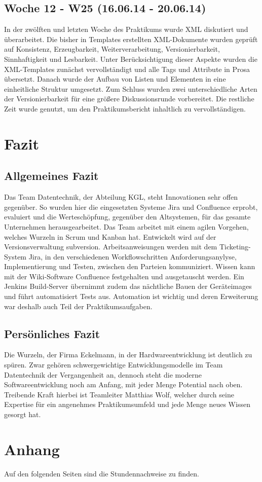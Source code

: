 \documentclass{article}
\begin{document}
\subsection{Woche 12 - W25 (16.06.14 - 20.06.14)}

In der zwölften und letzten Woche des Praktikums wurde XML diskutiert und überarbeitet. Die bisher in Templates erstellten XML-Dokumente wurden geprüft auf Konsistenz, Erzeugbarkeit, Weiterverarbeitung, Versionierbarkeit, Sinnhaftigkeit und Lesbarkeit. Unter Berücksichtigung dieser Aspekte wurden die XML-Templates zunächst vervollständigt und alle Tags und Attribute in Prosa übersetzt. Danach wurde der Aufbau von Listen und Elementen in eine einheitliche Struktur umgesetzt. Zum Schluss wurden zwei unterschiedliche Arten der Versionierbarkeit für eine größere Diskussionsrunde vorbereitet. Die restliche Zeit wurde genutzt, um den Praktikumsbericht inhaltlich zu vervollständigen.

\clearpage

\section{Fazit}

\subsection{Allgemeines Fazit}

Das Team Datentechnik, der Abteilung KGL, steht Innovationen sehr offen gegenüber. So wurden hier die eingesetzten Systeme Jira und Confluence erprobt, evaluiert und die Werteschöpfung, gegenüber den Altsystemen, für das gesamte Unternehmen herausgearbeitet. Das Team arbeitet mit einem agilen Vorgehen, welches Wurzeln in Scrum und Kanban hat. Entwickelt wird auf der Versionsverwaltung subversion. Arbeitsanweisungen werden mit dem Ticketing-System Jira, in den verschiedenen Workflowschritten Anforderungsanylyse, Implementierung und Testen, zwischen den Parteien kommuniziert. Wissen kann mit der Wiki-Software Confluence festgehalten und ausgetauscht werden.  Ein Jenkins Build-Server übernimmt zudem das nächtliche Bauen der Geräteimages und führt automatisiert Tests aus. Automation ist wichtig und deren Erweiterung war deshalb auch Teil der Praktikumsaufgaben. 

\subsection{Persönliches Fazit}

Die Wurzeln, der Firma Eckelmann, in der Hardwareentwicklung ist deutlich zu spüren. Zwar gehören schwergewichtige Entwicklungsmodelle im Team Datentechnik der Vergangenheit an, dennoch steht die moderne Softwareentwicklung noch am Anfang, mit jeder Menge Potential nach oben. Treibende Kraft hierbei ist Teamleiter Matthias Wolf, welcher durch seine Expertise für ein angenehmes Praktikumsumfeld und jede Menge neues Wissen gesorgt hat.

\clearpage
\section{Anhang}

Auf den folgenden Seiten sind die Stundennachweise zu finden.
\end{document}
